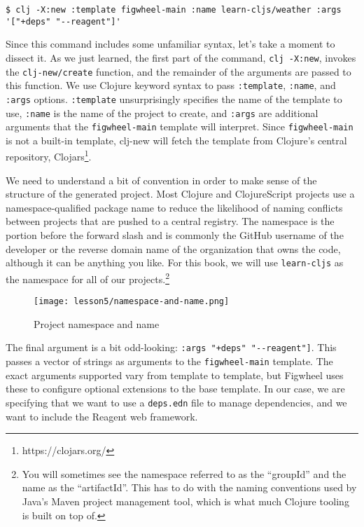 \documentclass[10pt,twoside,openright]{memoir}
\begin{document}
\begin{verbatim}
$ clj -X:new :template figwheel-main :name learn-cljs/weather :args '["+deps" "--reagent"]'
\end{verbatim}

Since this command includes some unfamiliar syntax, let's take a moment
to dissect it. As we just learned, the first part of the command,
\texttt{clj\ -X:new}, invokes the \texttt{clj-new/create} function, and
the remainder of the arguments are passed to this function. We use
Clojure keyword syntax to pass \texttt{:template}, \texttt{:name}, and
\texttt{:args} options. \texttt{:template} unsurprisingly specifies the
name of the template to use, \texttt{:name} is the name of the project
to create, and \texttt{:args} are additional arguments that the
\texttt{figwheel-main} template will interpret. Since
\texttt{figwheel-main} is not a built-in template, clj-new will fetch
the template from Clojure's central repository,
Clojars\footnote{https://clojars.org/}.


We need to understand a bit of convention in order to make sense of the
structure of the generated project. Most Clojure and ClojureScript
projects use a namespace-qualified package name to reduce the likelihood
of naming conflicts between projects that are pushed to a central
registry. The namespace is the portion before the forward slash and is
commonly the GitHub username of the developer or the reverse domain name
of the organization that owns the code, although it can be anything you
like. For this book, we will use \texttt{learn-cljs} as the namespace
for all of our projects.\footnote{You will sometimes see the namespace
  referred to as the ``groupId'' and the name as the ``artifactId''.
  This has to do with the naming conventions used by Java's Maven
  project management tool, which is what much Clojure tooling is built
  on top of.}

\begin{figure}[H]
\caption{Project namespace and name}
\centering
\texttt{[image: lesson5/namespace-and-name.png]}
\end{figure}

The final argument is a bit odd-looking:
\texttt{:args\ \textquotesingle{}{[}"+deps"\ "-\/-reagent"{]}\textquotesingle{}}.
This passes a vector of strings as arguments to the
\texttt{figwheel-main} template. The exact arguments supported vary from
template to template, but Figwheel uses these to configure optional
extensions to the base template. In our case, we are specifying that we
want to use a \texttt{deps.edn} file to manage dependencies, and we want
to include the Reagent web framework.
\end{document}
